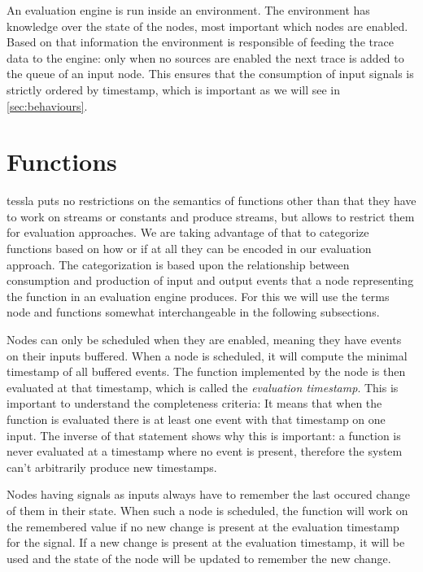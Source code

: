 An evaluation engine is run inside an environment.
The environment has knowledge over the state of the nodes, most important which nodes are enabled.
Based on that information the environment is responsible of feeding the trace data to the engine: only when no sources are enabled the next trace is added to the queue of an input node.
This ensures that the consumption of input signals is strictly ordered by timestamp, which is important as we will see in \cref{sec:behaviours}.


\section{ Functions}
\label{sec:definitions:tessla_functions}

\gls{tessla} puts no restrictions on the semantics of functions other than that they have to work on streams or constants and produce streams, but allows to restrict them for evaluation approaches.
We are taking advantage of that to categorize functions based on how or if at all they can be encoded in our evaluation approach.
The categorization is based upon the relationship between consumption and production of input and output events that a node representing the function in an evaluation engine produces.
For this we will use the terms node and functions somewhat interchangeable in the following subsections.

Nodes can only be scheduled when they are enabled, meaning they have events on their inputs buffered.
When a node is scheduled, it will compute the minimal timestamp of all buffered events.
The function implemented by the node is then evaluated at that timestamp, which is called the \emph{evaluation timestamp}.
This is important to understand the completeness criteria: It means that when the function is evaluated there is at least one event with that timestamp on one input.
The inverse of that statement shows why this is important: a function is never evaluated at a timestamp where no event is present, therefore the system can't arbitrarily produce new timestamps.

Nodes having signals as inputs always have to remember the last occured change of them in their state.
When such a node is scheduled, the function will work on the remembered value if no new change is present at the evaluation timestamp for the signal.
If a new change is present at the evaluation timestamp, it will be used and the state of the node will be updated to remember the new change.

